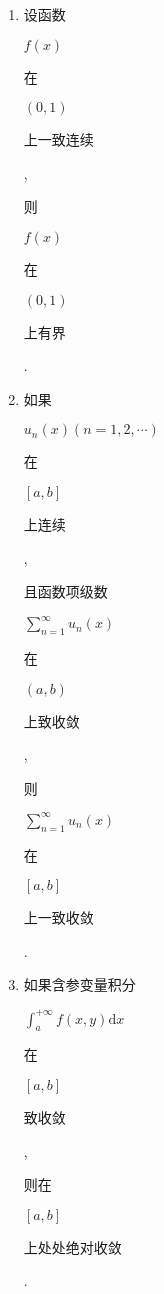 \documentclass[10pt]{article}
\begin{document}
\begin{enumerate}
  \item \begin{CJK}{UTF8}{mj}设函数\end{CJK} $f(x)$ \begin{CJK}{UTF8}{mj}在\end{CJK} $(0,1)$ \begin{CJK}{UTF8}{mj}上一致连续\end{CJK}, \begin{CJK}{UTF8}{mj}则\end{CJK} $f(x)$ \begin{CJK}{UTF8}{mj}在\end{CJK} $(0,1)$ \begin{CJK}{UTF8}{mj}上有界\end{CJK}.

  \item \begin{CJK}{UTF8}{mj}如果\end{CJK} $u_{n}(x)(n=1,2, \cdots)$ \begin{CJK}{UTF8}{mj}在\end{CJK} $[a, b]$ \begin{CJK}{UTF8}{mj}上连续\end{CJK}, \begin{CJK}{UTF8}{mj}且函数项级数\end{CJK} $\sum_{n=1}^{\infty} u_{n}(x)$ \begin{CJK}{UTF8}{mj}在\end{CJK} $(a, b)$ \begin{CJK}{UTF8}{mj}上致收敛\end{CJK}, \begin{CJK}{UTF8}{mj}则\end{CJK} $\sum_{n=1}^{\infty} u_{n}(x)$ \begin{CJK}{UTF8}{mj}在\end{CJK} $[a, b]$ \begin{CJK}{UTF8}{mj}上一致收敛\end{CJK}.

  \item \begin{CJK}{UTF8}{mj}如果含参变量积分\end{CJK} $\int_{a}^{+\infty} f(x, y) \mathrm{d} x$ \begin{CJK}{UTF8}{mj}在\end{CJK} $[a, b]$ \begin{CJK}{UTF8}{mj}致收敛\end{CJK}, \begin{CJK}{UTF8}{mj}则在\end{CJK} $[a, b]$ \begin{CJK}{UTF8}{mj}上处处绝对收敛\end{CJK}.

\end{enumerate}
\end{document}
